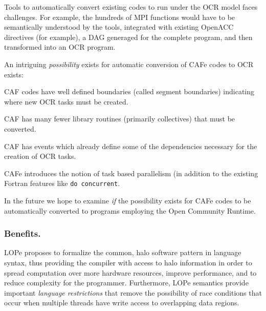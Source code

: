 Tools to automatically convert existing codes to run under the OCR model faces challenges.  For
example, the hundreds of MPI functions would have to be semantically understood by the tools,
integrated with existing OpenACC directives (for example), a DAG generaged for the complete
program, and then transformed into an OCR program.

An intriguing \emph{possibility} exists for automatic conversion of CAFe codes to OCR exists:
\item
  CAF codes have well defined boundaries (called segment boundaries) indicating where new
  OCR tasks must be created.
\item
  CAF has many fewer library routines (primarily collectives) that must be converted.
\item
  CAF has events which already define some of the dependencies necessary for the creation
  of OCR tasks.
\item
  CAFe introduces the notion of task based parallelism (in addition to the existing
  Fortran features like \texttt{do concurrent}.

In the future we hope to examine \emph{if} the possibility exists for CAFe codes to be
automatically converted to programs employing the Open Community Runtime.

\begin{comment}
These choices often hide the opportunity for
optimizations by the compiler \cite{Dubey:2014:SSC:2686745.2686756}.
\end{comment}

%
%


\subsubsection{Benefits.}
LOPe proposes to formalize the common, halo software pattern in language syntax, thus providing the
compiler with access to halo information in order to spread computation over more hardware
resources, improve performance, and to reduce complexity for the programmer.  Furthermore, LOPe
semantics provide important \emph{language restrictions} that remove the possibility of race conditions
that occur when multiple threads have write access to overlapping data regions.

